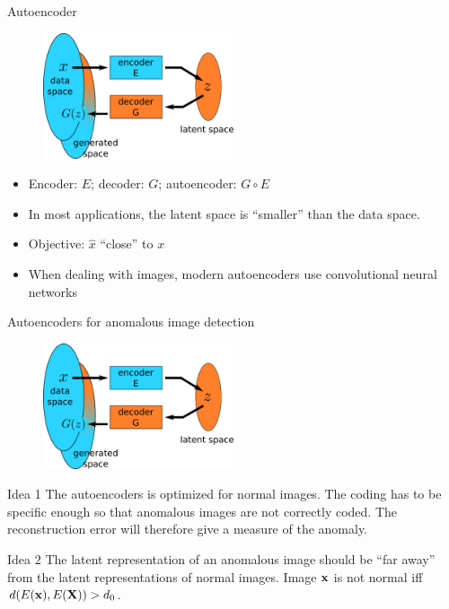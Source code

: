 \documentclass[xcolor=pdftex,dvipsnames,table,mathserif]{beamer}
\begin{document}
\begin{frame}{Autoencoder}

  \begin{figure}[ht]
    \centering
    \includegraphics[width=0.5\textwidth]{ae.png}
  \end{figure}

  \begin{itemize}
  \item Encoder: $E$; decoder: $G$; autoencoder: $G \circ E$
  \item In most applications, the latent space is ``smaller'' than the data space.
  \item Objective: $\hat{x}$ ``close'' to $x$
  \item When dealing with images, modern autoencoders use convolutional neural networks
  \end{itemize}

\end{frame}

\begin{frame}{Autoencoders for anomalous image detection}

  \begin{figure}[ht]
    \centering
    \includegraphics[width=0.5\textwidth]{ae.png}
  \end{figure}

  \begin{block}{Idea 1}
    The autoencoders is optimized for normal images. The coding has to be specific enough so that anomalous images are not correctly coded. The reconstruction error will therefore give a measure of the anomaly.
  \end{block}

  \begin{block}{Idea 2}
    The latent representation of an anomalous image should be ``far away'' from the latent representations of normal images. Image $\mathbf{x}$ is not normal iff $d(E(\mathbf{x}), E(\mathbf{X})) > d_0$.
  \end{block}

\end{frame}
\end{document}
